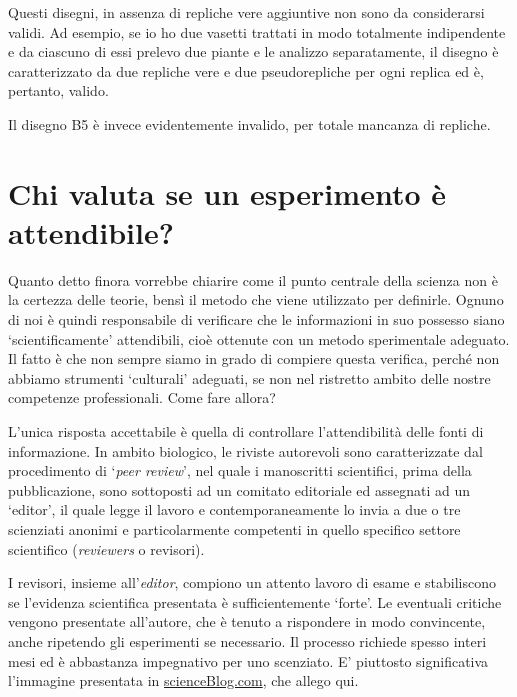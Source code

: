 \documentclass[a4paper,12pt,oneside]{book}
\begin{document}
Questi disegni, in assenza di repliche vere aggiuntive non sono da considerarsi validi. Ad esempio, se io ho due vasetti trattati in modo totalmente indipendente e da ciascuno di essi prelevo due piante e le analizzo separatamente, il disegno è caratterizzato da due repliche vere e due pseudorepliche per ogni replica ed è, pertanto, valido.

Il disegno B5 è invece evidentemente invalido, per totale mancanza di repliche.

\hypertarget{chi-valuta-se-un-esperimento-uxe8-attendibile}{%
\section{Chi valuta se un esperimento è attendibile?}\label{chi-valuta-se-un-esperimento-uxe8-attendibile}}

Quanto detto finora vorrebbe chiarire come il punto centrale della scienza non è la certezza delle teorie, bensì il metodo che viene utilizzato per definirle. Ognuno di noi è quindi responsabile di verificare che le informazioni in suo possesso siano `scientificamente' attendibili, cioè ottenute con un metodo sperimentale adeguato. Il fatto è che non sempre siamo in grado di compiere questa verifica, perché non abbiamo strumenti `culturali' adeguati, se non nel ristretto ambito delle nostre competenze professionali. Come fare allora?

L'unica risposta accettabile è quella di controllare l'attendibilità delle fonti di informazione. In ambito biologico, le riviste autorevoli sono caratterizzate dal procedimento di `\emph{peer review}', nel quale i manoscritti scientifici, prima della pubblicazione, sono sottoposti ad un comitato editoriale ed assegnati ad un `editor', il quale legge il lavoro e contemporaneamente lo invia a due o tre scienziati anonimi e particolarmente competenti in quello specifico settore scientifico (\emph{reviewers} o revisori).

I revisori, insieme all'\emph{editor}, compiono un attento lavoro di esame e stabiliscono se l'evidenza scientifica presentata è sufficientemente `forte'. Le eventuali critiche vengono presentate all'autore, che è tenuto a rispondere in modo convincente, anche ripetendo gli esperimenti se necessario. Il processo richiede spesso interi mesi ed è abbastanza impegnativo per uno scenziato. E' piuttosto significativa l'immagine presentata in \href{http://scienceblogs.com/startswithabang/2013/06/07/the-4-jobs-of-a-referee-in-peer-review/}{scienceBlog.com}, che allego qui.
\end{document}
